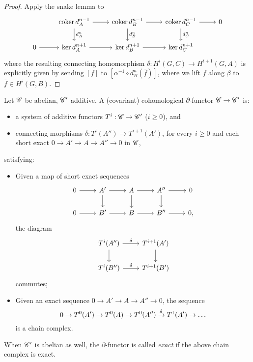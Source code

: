 \documentclass[11pt]{amsart}
\begin{document}
\begin{proof}
    Apply the snake lemma to
    \[
    \begin{tikzcd}
        & \coker d_A^{n-1} \arrow[r] \arrow[d, "d_A^n"] & \coker d_B^{n-1} \arrow[r] \arrow[d, "d_B^n"] & \coker d_C^{n-1} \arrow[r] \arrow[d, "d_C^n"] & 0 \\
        0 \arrow[r] & \ker d_A^{n+1} \arrow[r] & \ker d_B^{n+1} \arrow[r] & \ker d_C^{n+1} & 
    \end{tikzcd}
    \]
    where the resulting connecting homomorphism $\delta: H^i(G,C)\to H^{i+1}(G,A)$ is explicitly given by sending $[f]$ to $[\alpha^{-1}\circ d^n_B(\bar{f})]$, where we lift $f$ along $\beta$ to $\bar{f}\in H^i(G,B)$.
\end{proof}

\begin{defn}
    Let $\mathscr{C}$ be abelian, $\mathscr{C}'$ additive. A (covariant) cohomological $\partial$-functor $\mathscr{C}\to \mathscr{C}'$ is:
    \begin{itemize}
        \item a system of additive functors $T^i: \mathscr{C}\to \mathscr{C}'$ ($i\ge 0$), and
        \item connecting morphisms $\delta: T^i(A'') \to T^{i+1}(A')$, for every $i\ge 0$ and each short exact $0\to A'\to A\to A''\to 0$ in $\mathscr{C}$,
    \end{itemize}
    satisfying:
    \begin{itemize}
        \item Given a map of short exact sequences
        \[
        \begin{tikzcd}
            0 \arrow[r] & A' \arrow[r] \arrow[d] & A \arrow[r] \arrow[d] & A'' \arrow[r] \arrow[d] & 0 \\
            0 \arrow[r] & B' \arrow[r] & B \arrow[r] & B'' \arrow[r] & 0,
        \end{tikzcd}
        \]
        the diagram
        \[
        \begin{tikzcd}
            T^i(A'') \arrow[r, "\delta"] \arrow[d] & T^{i+1}(A') \arrow[d] \\
            T^i(B'') \arrow[r, "\delta"] & T^{i+1}(B')
        \end{tikzcd}
        \]
        commutes;
        \item Given an exact sequence $0\to A'\to A \to A''\to 0$, the sequence
        \[0 \to T^0(A') \to T^0(A) \to T^0(A'') \xrightarrow{\delta} T^1(A') \to\dots\]
        is a chain complex.
    \end{itemize}
    When $\mathscr{C}'$ is abelian as well, the $\partial$-functor is called \emph{exact} if the above chain complex is exact.
\end{defn}
\end{document}
